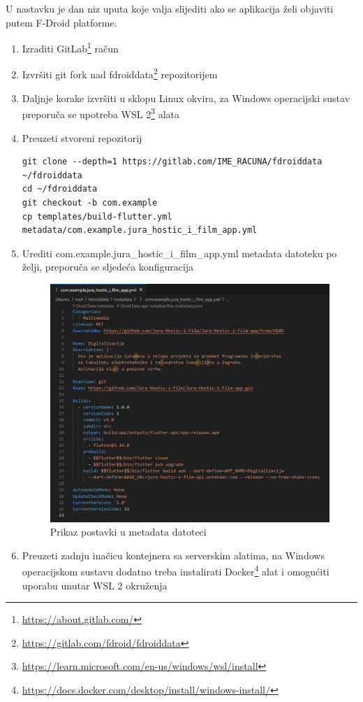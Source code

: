 			{U nastavku je dan niz uputa koje valja slijediti ako se aplikacija želi objaviti putem F-Droid platforme.}
			\begin{enumerate}
				\item{Izraditi GitLab\footnote{\url{https://about.gitlab.com/}} račun}
				\item{Izvršiti git fork nad fdroiddata\footnote{\url{https://gitlab.com/fdroid/fdroiddata}} repozitorijem}
				\item{Daljnje korake izvršiti u sklopu Linux okvira, za Windows operacijski sustav preporuča se upotreba WSL 2\footnote{\url{https://learn.microsoft.com/en-us/windows/wsl/install}} alata}
				\item{Preuzeti stvoreni repozitorij}
				\begin{verbatim}
git clone --depth=1 https://gitlab.com/IME_RACUNA/fdroiddata ~/fdroiddata
cd ~/fdroiddata
git checkout -b com.example
cp templates/build-flutter.yml metadata/com.example.jura_hostic_i_film_app.yml
				\end{verbatim}
				\item{Urediti com.example.jura\_hostic\_i\_film\_app.yml metadata datoteku po želji, preporuča se sljedeća konfiguracija}
				\begin{figure}[H]
					\includegraphics[width=\textwidth]{slike/metadata.png}
					\caption{Prikaz postavki u metadata datoteci}
					\label{fig:metadataPostavke}
				\end{figure}
				\item{Preuzeti zadnju inačicu kontejnera sa serverskim alatima, na Windows operacijskom sustavu dodatno treba instalirati Docker\footnote{\url{https://docs.docker.com/desktop/install/windows-install/}} alat i omogućiti uporabu unutar WSL 2 okruženja}

\end{enumerate}

